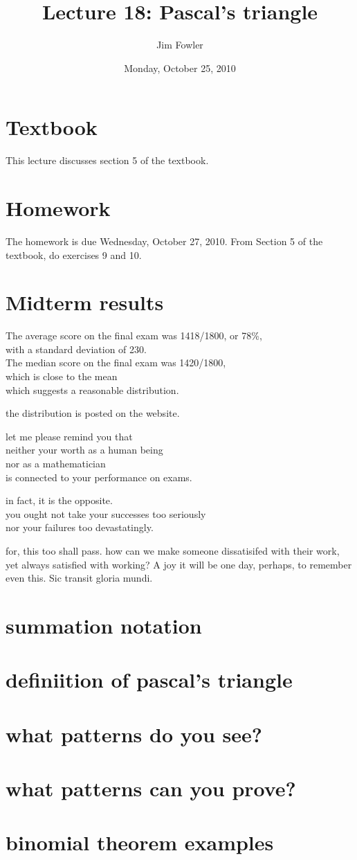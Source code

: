 \documentclass[12pt]{handout}
\title{Lecture 18: Pascal's triangle}
\author{Jim Fowler}
\date{Monday, October 25, 2010}
\begin{document}
\maketitle

\section*{Textbook}

This lecture discusses section 5 of the textbook.

\section*{Homework} 

The homework is due Wednesday, October 27, 2010.
From Section 5 of the textbook, do exercises 9 and 10.

\section*{Midterm results}

The average score on the final exam was 1418/1800, or 78\%, \\
with a standard deviation of 230. \\
The median score on the final exam was 1420/1800, \\
which is close to the mean \\
which suggests a reasonable distribution.

the distribution is posted on the website.

let me please remind you that \\
neither your worth as a human being \\
nor as a mathematician \\
is connected to your performance on exams.

in fact, it is the opposite. \\
you ought not take your successes too seriously \\
nor your failures too devastatingly.

for, this too shall pass.  how can we make someone dissatisifed with
their work, yet always satisfied with working?  A joy it will be one
day, perhaps, to remember even this.  Sic transit gloria mundi.

\section*{summation notation}

\section*{definiition of pascal's triangle}

\section*{what patterns do you see?}

\section*{what patterns can you prove?}

\section*{binomial theorem examples}
\end{document}
